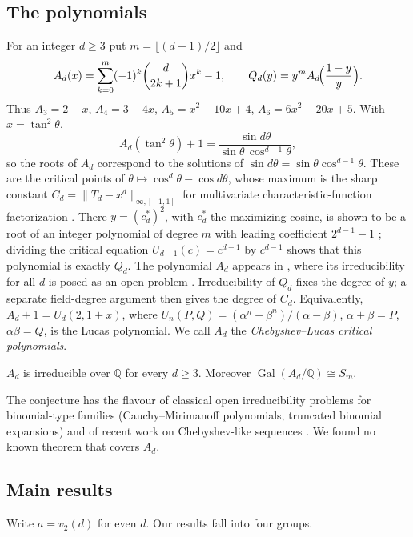\documentclass[11pt]{amsart}
\theoremstyle{definition}\newtheorem{definition}[theorem]{Definition}\newtheorem{example}[theorem]{Example}
\theoremstyle{remark}\newtheorem{remark}[theorem]{Remark}
\newcommand{\Q}{\mathbb Q}\newcommand{\Z}{\mathbb Z}\newcommand{\F}{\mathbb F}
\newcommand{\Gal}{\operatorname{Gal}}\newcommand{\disc}{\operatorname{disc}}\newcommand{\Res}{\operatorname{Res}}
\begin{document}
\subsection*{The polynomials}
For an integer $d\ge3$ put $m=\lfloor(d-1)/2\rfloor$ and
\begin{equation}\label{eq:Ad}
A_d(x)=\sum_{k=0}^{m}(-1)^k\binom d{2k+1}x^k-1,\qquad Q_d(y)=y^mA_d\!\Bigl(\frac{1-y}{y}\Bigr).
\end{equation}
Thus $A_3=2-x$, $A_4=3-4x$, $A_5=x^2-10x+4$, $A_6=6x^2-20x+5$. With $x=\tan^2\theta$,
\begin{equation}\label{eq:trig}
A_d(\tan^2\theta)+1=\frac{\sin d\theta}{\sin\theta\,\cos^{d-1}\theta},
\end{equation}
so the roots of $A_d$ correspond to the solutions of $\sin d\theta=\sin\theta\cos^{d-1}\theta$. These are the critical points of
$\theta\mapsto\cos^d\theta-\cos d\theta$, whose maximum is the sharp constant $C_d=\|T_d-x^d\|_{\infty,[-1,1]}$ for multivariate
characteristic-function factorization \cite{I}. There $y=(c_d^*)^2$, with $c_d^*$ the maximizing cosine, is shown to be a root of an integer polynomial of degree $m$ with
leading coefficient $2^{d-1}-1$ \cite[Prop.~5.2]{I}; dividing the critical equation $U_{d-1}(c)=c^{d-1}$ by $c^{d-1}$ shows that this polynomial is exactly $Q_d$.
The polynomial $A_d$ appears in \cite[Remark~5.3]{I}, where its irreducibility for all $d$ is posed as an open problem \cite[Sec.~10]{I}. Irreducibility of $Q_d$ fixes the degree
of $y$; a separate field-degree argument then gives the degree of $C_d$. Equivalently, $A_d+1=U_d(2,1+x)$, where $U_n(P,Q)=(\alpha^n-\beta^n)/(\alpha-\beta)$, $\alpha+\beta=P$, $\alpha\beta=Q$,
is the Lucas polynomial. We call $A_d$ the \emph{Chebyshev--Lucas critical polynomials}.

\begin{conjecture}\label{conj:main}
$A_d$ is irreducible over $\Q$ for every $d\ge3$. Moreover $\Gal(A_d/\Q)\cong S_m$.
\end{conjecture}

The conjecture has the flavour of classical open irreducibility problems for binomial-type families (Cauchy--Mirimanoff polynomials,
truncated binomial expansions) and of recent work on Chebyshev-like sequences \cite{DKS}. We found no known theorem that covers $A_d$.

\subsection*{Main results}
Write $a=v_2(d)$ for even $d$. Our results fall into four groups.
\end{document}
